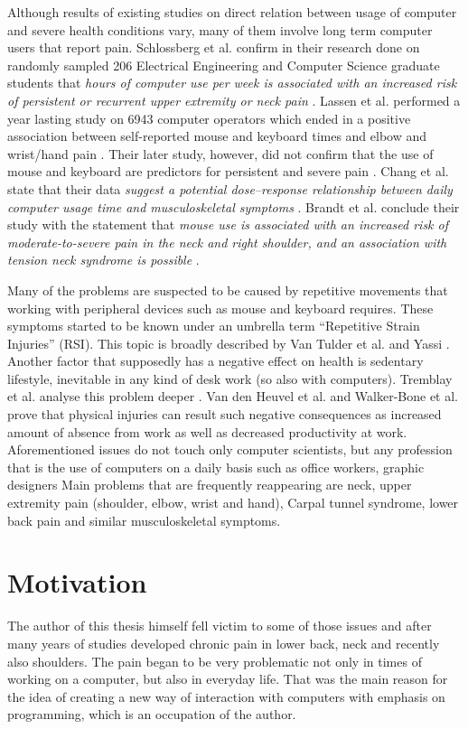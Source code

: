  Although results of existing studies on direct relation between usage of computer and severe health conditions vary, many of them involve long term computer users that report pain. Schlossberg et al. confirm in their research done on randomly sampled 206 Electrical Engineering and Computer Science graduate students that \textit{hours of computer use per week is associated with an increased risk of persistent or recurrent upper extremity or neck pain}  \cite{Schlossberg2004}. Lassen et al. performed a year lasting study on 6943 computer operators which ended in a positive association between self-reported mouse and keyboard times and elbow and wrist/hand pain \cite{Lassen2004}. Their later study, however, did not confirm that the use of mouse and keyboard are predictors for persistent and severe pain \cite{Lassen2005}. Chang et al. state that their data \textit{suggest a potential dose–response relationship between daily computer usage time and musculoskeletal symptoms} \cite{Chang2007}. Brandt et al. conclude their study with the statement that \textit{mouse use is associated with an increased risk of moderate-to-severe pain in the neck and right
shoulder, and an association with tension neck syndrome is possible} \cite{Brandt2004}.
 
 Many of the problems are suspected to be caused by repetitive movements that working with peripheral devices such as mouse and keyboard requires. These symptoms started to be known under an umbrella term ``Repetitive Strain Injuries'' (RSI). This topic is broadly described by Van Tulder et al. \cite{VanTulder2007} and Yassi \cite{Yassi1997}. Another factor that supposedly has a negative effect on health is sedentary lifestyle, inevitable in any kind of desk work (so also with computers). Tremblay et al. analyse this problem deeper \cite{Tremblay2010}. Van den Heuvel et al. \cite{Van2007} and Walker-Bone et al. \cite{Walker2005} prove that physical injuries can result such negative consequences as increased amount of absence from work as well as decreased productivity at work. Aforementioned issues do not touch only computer scientists, but any profession that is the use of computers on a daily basis such as office workers, graphic designers \etc  Main problems that are frequently reappearing are neck, upper extremity pain (shoulder, elbow, wrist and hand), Carpal tunnel syndrome, lower back pain and similar musculoskeletal symptoms. 
 
\section{Motivation}
The author of this thesis himself fell victim to some of those issues and after many years of studies developed chronic pain in lower back, neck and recently also shoulders. The pain began to be very problematic not only in times of working on a computer, but also in everyday life. That was the main reason for the idea of creating a new way of interaction with computers with emphasis on programming, which is an occupation of the author.

